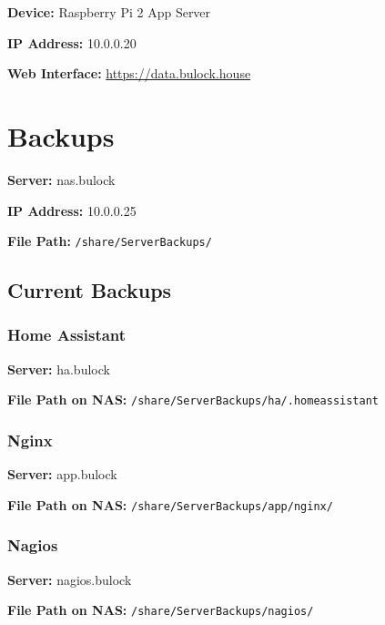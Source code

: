 \documentclass[]{article}
\begin{document}
\textbf{Device: }
{Raspberry Pi 2 App Server}

\textbf{IP Address: }
{10.0.0.20}

\textbf{Web Interface: }
{\href{https://www.google.com/url?q=https://data.bulock.house\&sa=D\&ust=1544293199854000}{https://data.bulock.house}}



\newpage

\vspace{\baselineskip}\section*{Backups}

\textbf{Server: }
{nas.bulock}

\textbf{IP Address: }
{10.0.0.25}

\textbf{File Path: }
\texttt{/share/ServerBackups/}

\subsection{\texorpdfstring{{Current Backups}}{Current Backups}}

\subsubsection{\texorpdfstring{{Home Assistant}}{Home Assistant}}

\textbf{Server: }
{ha.bulock}

\textbf{File Path on NAS: }
\texttt{/share/ServerBackups/ha/.homeassistant}

\subsubsection{\texorpdfstring{{Nginx}}{Nginx}}

\textbf{Server: }
{app.bulock}

\textbf{File Path on NAS: }
\texttt{/share/ServerBackups/app/nginx/}

\subsubsection{\texorpdfstring{{Nagios}}{Nagios}}

\textbf{Server: }
{nagios.bulock}

\textbf{File Path on NAS: }
\texttt{/share/ServerBackups/nagios/}
\end{document}
